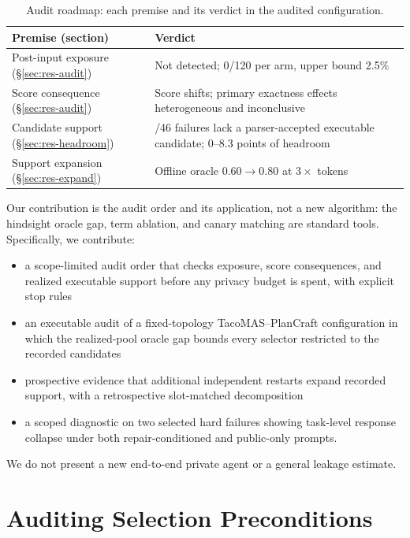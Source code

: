 \documentclass[11pt]{article}
\begin{document}
\begin{table}[t]
\caption{Audit roadmap: each premise and its verdict in the audited configuration.}
\label{tab:roadmap}
\centering
\small
\setlength{\tabcolsep}{3pt}
\begin{tabular}{>{\raggedright\arraybackslash}p{}>{\raggedright\arraybackslash}p{}}
\toprule
Premise (section) & Verdict \\
\midrule
Post-input exposure (\S\ref{sec:res-audit}) & Not detected; 0/120 per arm, upper bound 2.5\% \\
Score consequence (\S\ref{sec:res-audit}) & Score shifts; primary exactness effects heterogeneous and inconclusive \\
Candidate support (\S\ref{sec:res-headroom}) & 43/46 failures lack a parser-accepted executable candidate; 0--8.3 points of headroom \\
Support expansion (\S\ref{sec:res-expand}) & Offline oracle $0.60\to0.80$ at $3\times$ tokens \\
\bottomrule
\end{tabular}
\end{table}

Our contribution is the audit order and its application, not a new algorithm: the hindsight oracle gap, term ablation, and canary matching are standard tools. Specifically, we contribute:
\begin{itemize}
    \setlength{\itemsep}{1pt}
    \item a scope-limited audit order that checks exposure, score consequences, and realized executable support before any privacy budget is spent, with explicit stop rules
    \item an executable audit of a fixed-topology TacoMAS--PlanCraft configuration in which the realized-pool oracle gap bounds every selector restricted to the recorded candidates
    \item prospective evidence that additional independent restarts expand recorded support, with a retrospective slot-matched decomposition
    \item a scoped diagnostic on two selected hard failures showing task-level response collapse under both repair-conditioned and public-only prompts.
\end{itemize}
We do not present a new end-to-end private agent or a general leakage estimate.

\section{Auditing Selection Preconditions}
\end{document}
